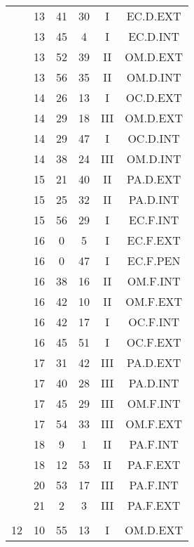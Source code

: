 \documentclass[12pt, a4paper]{article}
\begin{document}
\begin{multicols}{3}
{\begin{tabular}{c c c c c c}
	 	 	 	 & 13 & 41 & 30 & I & EC.D.EXT\\%
	 	 	 	 & 13 & 45 & 4 & I & EC.D.INT\\%
	 	 	 	 & 13 & 52 & 39 & II & OM.D.EXT\\%
	 	 	 	 & 13 & 56 & 35 & II & OM.D.INT\\%
	 	 	 	 & 14 & 26 & 13 & I & OC.D.EXT\\%
	 	 	 	 & 14 & 29 & 18 & III & OM.D.EXT\\%
	 	 	 	 & 14 & 29 & 47 & I & OC.D.INT\\%
	 	 	 	 & 14 & 38 & 24 & III & OM.D.INT\\%
	 	 	 	 & 15 & 21 & 40 & II & PA.D.EXT\\%
	 	 	 	 & 15 & 25 & 32 & II & PA.D.INT\\%
	 	 	 	 & 15 & 56 & 29 & I & EC.F.INT\\%
	 	 	 	 & 16 & 0 & 5 & I & EC.F.EXT\\%
	 	 	 	 & 16 & 0 & 47 & I & EC.F.PEN\\%
	 	 	 	 & 16 & 38 & 16 & II & OM.F.INT\\%
	 	 	 	 & 16 & 42 & 10 & II & OM.F.EXT\\%
	 	 	 	 & 16 & 42 & 17 & I & OC.F.INT\\%
	 	 	 	 & 16 & 45 & 51 & I & OC.F.EXT\\%
	 	 	 	 & 17 & 31 & 42 & III & PA.D.EXT\\%
	 	 	 	 & 17 & 40 & 28 & III & PA.D.INT\\%
	 	 	 	 & 17 & 45 & 29 & III & OM.F.INT\\%
	 	 	 	 & 17 & 54 & 33 & III & OM.F.EXT\\%
	 	 	 	 & 18 & 9 & 1 & II & PA.F.INT\\%
	 	 	 	 & 18 & 12 & 53 & II & PA.F.EXT\\%
	 	 	 	 & 20 & 53 & 17 & III & PA.F.INT\\%
	 	 	 	 & 21 & 2 & 3 & III & PA.F.EXT\\%
	 	 	 	 & & & & & \\%
	 	 	 	12 & 10 & 55 & 13 & I & OM.D.EXT\\%
	 	 \end{tabular}
 	}
\end{multicols}
\end{document}
